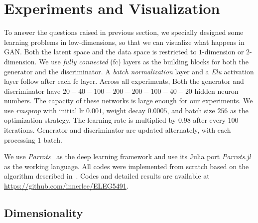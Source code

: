 \section{Experiments and Visualization} \label{sec:exp}

To answer the questions raised in previous section,
we specially designed some learning problems in low-dimensions,
so that we can visualize what happens in GAN.
Both the latent space and the data space is
restricted to $1$-dimension or $2$-dimension.
We use \emph{fully connected} (fc) layers as the building blocks for both
the generator and the discriminator.
A \emph{batch normalization} layer and a \emph{Elu} activation layer
follow after each fc layer.
Across all experiments,
Both the generator and discriminator have
$20-40-100-200-200-100-40-20$ hidden neuron numbers.
The capacity of these networks is large enough for our experiments.
We use \emph{rmsprop} with initial lr $0.001$,
weight decay $0.0005$, and batch size $256$
as the optimization strategy.
The learning rate is multiplied by $0.98$ after every $100$ iterations.
Generator and discriminator are updated alternately,
with each processing $1$ batch.

We use \emph{Parrots}~\cite{parrots} as the deep learning framework
and use its Julia port \emph{Parrots.jl}~\cite{parrotsjl}
as the working language.
All codes were implemented from scratch based on
the algorithm described in~\cite{goodfellow2014generative}.
Codes and detailed results are available at
\url{https://github.com/innerlee/ELEG5491}.

\subsection{Dimensionality}

